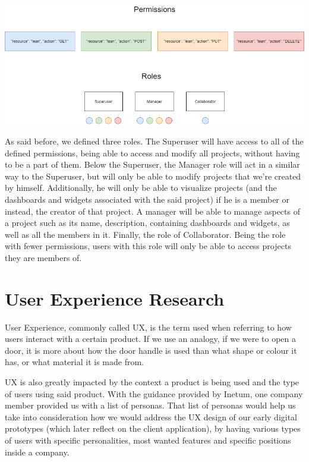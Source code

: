 \documentclass[a4paper,twoside,10pt]{report}
\begin{document}
\begin{center}
    \includegraphics[width=\textwidth]{lean-rbac-model.png}
\end{center}

As said before, we defined three roles. The Superuser will have access to all of the defined permissions, being able to access and modify all projects,  without having to be a part of them. 
Below the Superuser, the Manager role will act in a similar way to the Superuser, but will only be able to modify projects that we're created by himself. Additionally, he will only be able to visualize projects (and the dashboards and widgets associated with the said project) if he is a member or instead, the creator of that project. A manager will be able to manage aspects of a project such as its name, description, containing dashboards and widgets, as well as all the members in it.
Finally, the role of Collaborator. Being the role with fewer permissions, users with this role will only be able to access projects they are members of.

\chapter{User Experience Research}
User Experience, commonly called UX, is the term used when referring to how users interact with a certain product. If we use an analogy, if we were to open a door, it is more about how the door handle is used than what shape or colour it has, or what material it is made from. 

UX is also greatly impacted by the context a product is being used and the type of users using said product. With the guidance provided by Inetum, one company member provided us with a list of personas. That list of personas would help us take into consideration how we would address the UX design of our early digital prototypes (which later reflect on the client application), by having various types of users with specific personalities, most wanted features and specific positions inside a company. 
\end{document}
